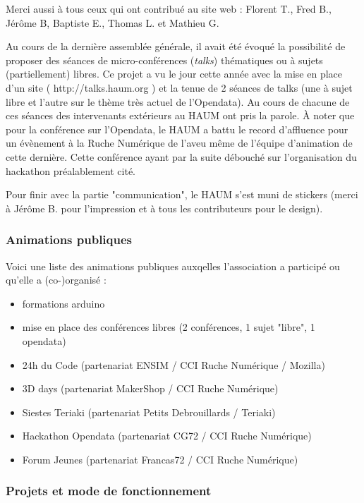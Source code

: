 \documentclass[11pt]{article}
\begin{document}
Merci aussi à tous ceux qui ont contribué au site web : Florent T., Fred B., Jérôme B, Baptiste E., Thomas L. et Mathieu G.

Au cours de la dernière assemblée générale, il avait été évoqué la possibilité de proposer des séances de micro-conférences (\textit{talks}) thématiques ou à sujets (partiellement) libres.
Ce projet a vu le jour cette année avec la mise en place d'un site ( http://talks.haum.org ) et la tenue de 2 séances de talks (une à sujet libre et l'autre sur le thème très actuel de l'Opendata).
Au cours de chacune de ces séances des intervenants extérieurs au HAUM ont pris la parole. À noter que pour la conférence sur l'Opendata, le HAUM a battu le record d'affluence pour un évènement à la Ruche Numérique de l'aveu même de l'équipe d'animation de cette dernière. Cette conférence ayant par la suite débouché sur l'organisation du hackathon préalablement cité.

Pour finir avec la partie "communication", le HAUM s'est muni de stickers (merci à Jérôme B. pour l'impression et à tous les contributeurs pour le design).

\subsubsection{Animations publiques}

Voici une liste des animations publiques auxqelles l'association a participé ou qu'elle a (co-)organisé :

\begin{itemize}
    \item formations arduino
    \item mise en place des conférences libres (2 conférences, 1 sujet "libre", 1 opendata)
    \item 24h du Code (partenariat ENSIM / CCI Ruche Numérique / Mozilla)
    \item 3D days (partenariat MakerShop / CCI Ruche Numérique)
    \item Siestes Teriaki (partenariat Petits Debrouillards / Teriaki)
    \item Hackathon Opendata (partenariat CG72 / CCI Ruche Numérique)
    \item Forum Jeunes (partenariat Francas72 / CCI Ruche Numérique)
\end{itemize}

\subsubsection{Projets et mode de fonctionnement}
\end{document}
